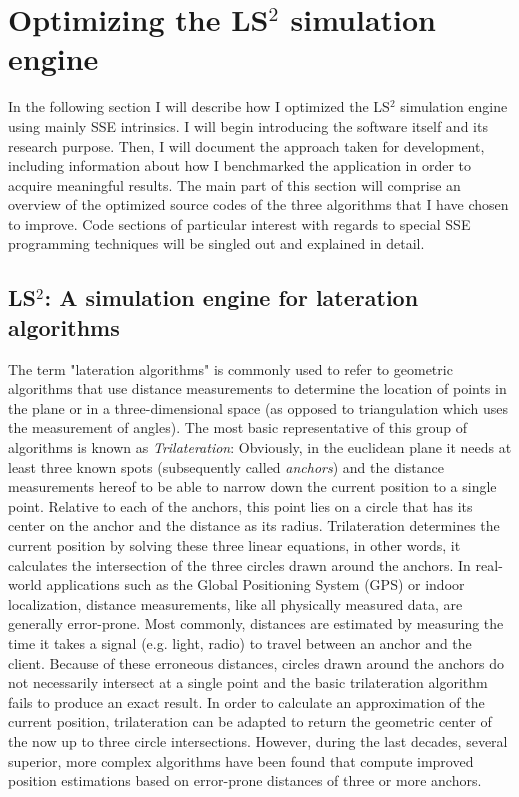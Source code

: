 \section{Optimizing the LS$^{2}$ simulation engine}
\label{Implementation}
In the following section I will describe how I optimized the LS$^{2}$ simulation engine using mainly SSE intrinsics. I will begin introducing the software itself and its research purpose. Then, I will document the approach taken for development, including information about how I benchmarked the application in order to acquire meaningful results. The main part of this section will comprise an overview of the optimized source codes of the three algorithms that I have chosen to improve. Code sections of particular interest with regards to special SSE programming techniques will be singled out and explained in detail.
\subsection{LS$^{2}$: A simulation engine for lateration algorithms}

The term "lateration algorithms" is commonly used to refer to geometric algorithms that use distance measurements to determine the location of points in the plane or in a three-dimensional space (as opposed to triangulation which uses the measurement of angles). The most basic representative of this group of algorithms is known as \emph{Trilateration}: Obviously, in the euclidean plane it needs at least three known spots (subsequently called \emph{anchors}) and the distance measurements hereof to be able to narrow down the current position to a single point. Relative to each of the anchors, this point lies on a circle that has its center on the anchor and the distance as its radius. Trilateration determines the current position by solving these three linear equations, in other words, it calculates the intersection of the three circles drawn around the anchors. In real-world applications such as the Global Positioning System (GPS) or indoor localization, distance measurements, like all physically measured data, are generally error-prone. Most commonly, distances are estimated by measuring the time it takes a signal (e.g. light, radio) to travel between an anchor and the client. Because of these erroneous distances, circles drawn around the anchors do not necessarily intersect at a single point and the basic trilateration algorithm fails to produce an exact result. In order to calculate an approximation of the current position, trilateration can be adapted to return the geometric center of the now up to three circle intersections. However, during the last decades, several superior, more complex algorithms have been found that compute improved position estimations based on error-prone distances of three or more anchors.

